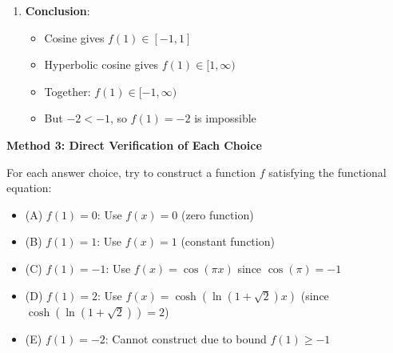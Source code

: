\documentclass[12pt]{article}
\begin{document}
\begin{solutionbox}
\begin{enumerate}
    \item \textbf{Conclusion}:
    \begin{itemize}
        \item Cosine gives $f(1) \in [-1, 1]$
        \item Hyperbolic cosine gives $f(1) \in [1, \infty)$
        \item Together: $f(1) \in [-1, \infty)$
        \item But $-2 < -1$, so $f(1) = -2$ is impossible
    \end{itemize}
\end{enumerate}

\textbf{Method 3: Direct Verification of Each Choice}

For each answer choice, try to construct a function $f$ satisfying the functional equation:
\begin{itemize}
    \item (A) $f(1) = 0$: Use $f(x) = 0$ (zero function)
    \item (B) $f(1) = 1$: Use $f(x) = 1$ (constant function)
    \item (C) $f(1) = -1$: Use $f(x) = \cos(\pi x)$ since $\cos(\pi) = -1$
    \item (D) $f(1) = 2$: Use $f(x) = \cosh(\ln(1 + \sqrt{2})x)$ (since $\cosh(\ln(1+\sqrt{2})) = 2$)
    \item (E) $f(1) = -2$: Cannot construct due to bound $f(1) \geq -1$
\end{itemize}

\end{solutionbox}
\end{document}
